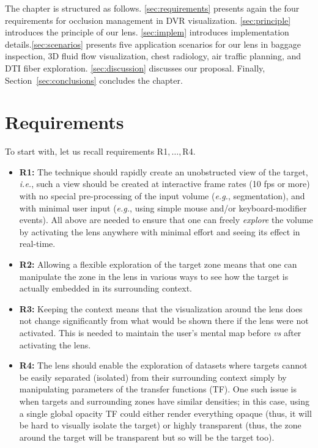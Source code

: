 The chapter is structured as follows. \autoref{sec:requirements} presents again the four requirements for occlusion management in DVR visualization. \autoref{sec:principle} introduces the principle of our lens. \autoref{sec:implem} introduces implementation details.\autoref{sec:scenarios} presents five application scenarios for our lens in baggage inspection, 3D fluid flow visualization, chest radiology, air traffic planning, and DTI fiber exploration. \autoref{sec:discussion} discusses our proposal. Finally, Section~\autoref{sec:conclusions} concludes the chapter.

\section{Requirements}
\label{sec:requirements}

To start with, let us recall requirements R1$,\ldots,$R4.
\begin{itemize}
\item{\textbf{R1:}} The technique should rapidly create an unobstructed view of the target, \emph{i.e.}, such a view should be created at interactive frame rates (10 fps or more) with no special pre-processing of the input volume (\emph{e.g.}, segmentation), and with minimal user input (\emph{e.g.}, using simple mouse and/or keyboard-modifier events). All above are needed to ensure that one can freely \emph{explore} the volume by activating the lens anywhere with minimal effort and seeing its effect in real-time.

\item{\textbf{R2:}} Allowing a flexible exploration of the target zone means that one can manipulate the zone in the lens in various ways to see how the target is actually embedded in its surrounding context.

\item{\textbf{R3:}} Keeping the context means that the visualization around the lens does not change significantly from what would be shown there if the lens were not activated. This is needed to maintain the user's mental map before \emph{vs} after activating the lens.

\item{\textbf{R4:}} The lens should enable the exploration of datasets where targets cannot be easily separated (isolated) from their surrounding context simply by manipulating parameters of the transfer functions (TF). One such issue is when targets and surrounding zones have similar densities; in this case, using a single global opacity TF could either render everything opaque (thus, it will be hard to visually isolate the target) or highly transparent (thus, the zone around the target will be transparent but so will be the target too).
\end{itemize}





